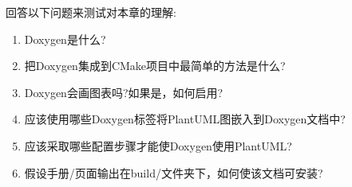 回答以下问题来测试对本章的理解:

\begin{enumerate}
\item 
Doxygen是什么?

\item 
把Doxygen集成到CMake项目中最简单的方法是什么?

\item 
Doxygen会画图表吗?如果是，如何启用?

\item 
应该使用哪些Doxygen标签将PlantUML图嵌入到Doxygen文档中?

\item 
应该采取哪些配置步骤才能使Doxygen使用PlantUML?

\item 
假设手册/页面输出在build/文件夹下，如何使该文档可安装?
\end{enumerate}